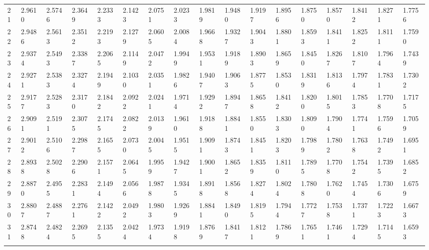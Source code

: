 {\begin{tabular}{|m{8pt}|m{18pt}*{15}{m{18pt}}}
 21 & 2.9610 & 2.5746 & 2.3649 & 2.2333 & 2.1423 & 2.0751 & 2.0233 & 1.9819 & 1.9480 & 1.9197 & 1.8956 & 1.8750 & 1.8570 & 1.8412 & 1.8271 & 1.7756 \\[2pt] \arrayrulecolor{light-gray}\hline\arrayrulecolor{black}  
 22 & 2.9486 & 2.5613 & 2.3512 & 2.2193 & 2.1279 & 2.0605 & 2.0084 & 1.9668 & 1.9327 & 1.9043 & 1.8801 & 1.8593 & 1.8411 & 1.8252 & 1.8111 & 1.7590 \\[2pt] \arrayrulecolor{light-gray}\hline\arrayrulecolor{black}  
 23 & 2.9374 & 2.5493 & 2.3387 & 2.2065 & 2.1149 & 2.0472 & 1.9949 & 1.9531 & 1.9189 & 1.8903 & 1.8659 & 1.8450 & 1.8267 & 1.8107 & 1.7964 & 1.7439 \\[2pt] \arrayrulecolor{light-gray}\hline\arrayrulecolor{black}  
 24 & 2.9271 & 2.5383 & 2.3274 & 2.1949 & 2.1030 & 2.0351 & 1.9826 & 1.9407 & 1.9063 & 1.8775 & 1.8530 & 1.8319 & 1.8136 & 1.7974 & 1.7831 & 1.7302 \\[2pt] \arrayrulecolor{light-gray}\hline\arrayrulecolor{black}  
 25 & 2.9177 & 2.5283 & 2.3170 & 2.1842 & 2.0922 & 2.0241 & 1.9714 & 1.9292 & 1.8947 & 1.8658 & 1.8412 & 1.8200 & 1.8015 & 1.7853 & 1.7708 & 1.7175 \\[2pt] \arrayrulecolor{light-gray}\hline\arrayrulecolor{black}  
 26 & 2.9091 & 2.5191 & 2.3075 & 2.1745 & 2.0822 & 2.0139 & 1.9610 & 1.9188 & 1.8841 & 1.8550 & 1.8303 & 1.8090 & 1.7904 & 1.7741 & 1.7596 & 1.7059 \\[2pt] \arrayrulecolor{light-gray}\hline\arrayrulecolor{black}  
 27 & 2.9012 & 2.5106 & 2.2987 & 2.1655 & 2.0730 & 2.0045 & 1.9515 & 1.9091 & 1.8743 & 1.8451 & 1.8203 & 1.7989 & 1.7802 & 1.7638 & 1.7492 & 1.6951 \\[2pt] \arrayrulecolor{light-gray}\hline\arrayrulecolor{black}  
 28 & 2.8938 & 2.5028 & 2.2906 & 2.1571 & 2.0645 & 1.9959 & 1.9427 & 1.9001 & 1.8652 & 1.8359 & 1.8110 & 1.7895 & 1.7708 & 1.7542 & 1.7395 & 1.6852 \\[2pt] \arrayrulecolor{light-gray}\hline\arrayrulecolor{black}  
 29 & 2.8870 & 2.4955 & 2.2831 & 2.1494 & 2.0566 & 1.9878 & 1.9345 & 1.8918 & 1.8568 & 1.8274 & 1.8024 & 1.7808 & 1.7620 & 1.7454 & 1.7306 & 1.6759 \\[2pt] \arrayrulecolor{light-gray}\hline\arrayrulecolor{black}  
 30 & 2.8807 & 2.4887 & 2.2761 & 2.1422 & 2.0492 & 1.9803 & 1.9269 & 1.8841 & 1.8490 & 1.8195 & 1.7944 & 1.7727 & 1.7538 & 1.7371 & 1.7223 & 1.6673 \\[2pt] \arrayrulecolor{light-gray}\hline\arrayrulecolor{black}  
 31 & 2.8748 & 2.4824 & 2.2695 & 2.1355 & 2.0424 & 1.9734 & 1.9198 & 1.8769 & 1.8417 & 1.8121 & 1.7869 & 1.7651 & 1.7461 & 1.7294 & 1.7145 & 1.6593 \\[2pt] \arrayrulecolor{light-gray}\hline\arrayrulecolor{black}  

\end{tabular}}
